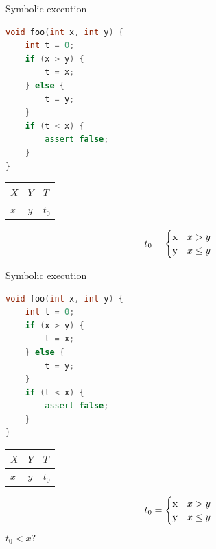 \documentclass{beamer}
\begin{document}
\begin{frame}[fragile]{Symbolic execution}
\begin{minipage}{0.49\textwidth}
\begin{lstlisting}[language=C++]
void foo(int x, int y) {
    int t = 0;
    if (x > y) {
        t = x;
    } else {
        t = y;
    }
    if (t < x) {
        assert false;
    }
}
\end{lstlisting}
\end{minipage}
\hfill
\begin{minipage}{0.49\textwidth}
\begin{center}
\begin{tabular}{ | l | l | l | }
\hline
$X$ & $Y$ & $T$ \\
\hline
$x$ & $y$ & $t_0$ \\
\hline
\end{tabular}
\begin{equation*}
t_0 =
    \begin{cases}
    $x$ &\text{$x > y$}\\
    $y$ &\text{$x \le y$}
    \end{cases}
\end{equation*}
\end{center}
\end{minipage}
\end{frame}

\begin{frame}[fragile]{Symbolic execution}
\begin{minipage}{0.49\textwidth}
\begin{lstlisting}[language=C++]
void foo(int x, int y) {
    int t = 0;
    if (x > y) {
        t = x;
    } else {
        t = y;
    }
    if (t < x) {
        assert false;
    }
}
\end{lstlisting}
\end{minipage}
\hfill
\begin{minipage}{0.49\textwidth}
\begin{center}
\begin{tabular}{ | l | l | l | }
\hline
$X$ & $Y$ & $T$ \\
\hline
$x$ & $y$ & $t_0$ \\
\hline
\end{tabular}
\begin{equation*}
t_0 =
    \begin{cases}
    $x$ &\text{$x > y$}\\
    $y$ &\text{$x \le y$}
    \end{cases}
\end{equation*}
$t_0 < x?$
\end{center}
\end{minipage}
\end{frame}
\end{document}
